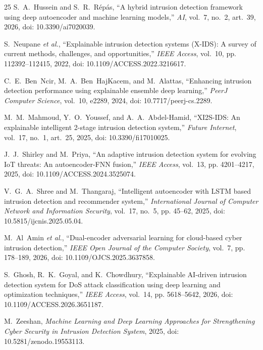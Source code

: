 \documentclass[journal]{IEEEtran}
\begin{document}
\begin{thebibliography}{25}
S.~A.~Hussein and S.~R.~R\'ep\'as, ``A hybrid intrusion detection framework using deep autoencoder and machine learning models,'' \textit{AI}, vol.~7, no.~2, art.~39, 2026, doi: 10.3390/ai7020039.

S.~Neupane \textit{et al.}, ``Explainable intrusion detection systems (X-IDS): A survey of current methods, challenges, and opportunities,'' \textit{IEEE Access}, vol.~10, pp. 112392--112415, 2022, doi: 10.1109/ACCESS.2022.3216617.

C.~E.~Ben~Ncir, M.~A.~Ben~HajKacem, and M.~Alattas, ``Enhancing intrusion detection performance using explainable ensemble deep learning,'' \textit{PeerJ Computer Science}, vol.~10, e2289, 2024, doi: 10.7717/peerj-cs.2289.

M.~M.~Mahmoud, Y.~O.~Youssef, and A.~A.~Abdel-Hamid, ``XI2S-IDS: An explainable intelligent 2-stage intrusion detection system,'' \textit{Future Internet}, vol.~17, no.~1, art.~25, 2025, doi: 10.3390/fi17010025.

J.~J.~Shirley and M.~Priya, ``An adaptive intrusion detection system for evolving IoT threats: An autoencoder-FNN fusion,'' \textit{IEEE Access}, vol.~13, pp. 4201--4217, 2025, doi: 10.1109/ACCESS.2024.3525074.

V.~G.~A.~Shree and M.~Thangaraj, ``Intelligent autoencoder with LSTM based intrusion detection and recommender system,'' \textit{International Journal of Computer Network and Information Security}, vol.~17, no.~5, pp. 45--62, 2025, doi: 10.5815/ijcnis.2025.05.04.

M.~Al~Amin \textit{et al.}, ``Dual-encoder adversarial learning for cloud-based cyber intrusion detection,'' \textit{IEEE Open Journal of the Computer Society}, vol.~7, pp. 178--189, 2026, doi: 10.1109/OJCS.2025.3637858.

S.~Ghosh, R.~K.~Goyal, and K.~Chowdhury, ``Explainable AI-driven intrusion detection system for DoS attack classification using deep learning and optimization techniques,'' \textit{IEEE Access}, vol.~14, pp. 5618--5642, 2026, doi: 10.1109/ACCESS.2026.3651187.

M.~Zeeshan, \textit{Machine Learning and Deep Learning Approaches for Strengthening Cyber Security in Intrusion Detection System}, 2025, doi: 10.5281/zenodo.19553113.

\end{thebibliography}
\end{document}
